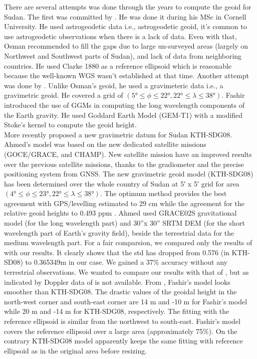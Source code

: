 There are several attempts was done through the years to compute the geoid for Sudan. The first was committed by \cite{osman}. He was done it during his MSc in Cornell University. He used astrogeodetic data i.e., astrogeodetic geoid, it's common to use astrogeodetic observations when there is a lack of data. Even with that, Osman recommended to fill the gaps due to large un-surveyed areas (largely on Northwest and Southwest parts of Sudan), and lack of data from neighboring countries. He used Clarke 1880 as a reference ellipsoid which is reasonable because the well-known WGS wasn't established at that time. Another attempt was done by \cite{fashir}. Unlike Osman's geoid, he used a gravimeteric data i.e., a gravimetric geoid. He covered a grid of $(5 \si{\degree} \le \phi \le 22 \si{\degree} , 22 \si{\degree} \le \lambda \le 38\si{\degree})$. Fashir introduced the use of GGMs in computing the long wavelength components of the Earth gravity. He used Goddard Earth Model (GEM-T1) with a modified Stoke's kernel to compute the geoid height.\\
More recently \citep{ahmed_msc} proposed a new gravimetric datum for Sudan KTH-SDG08. Ahmed's model was based on the new dedicated satellite missions (GOCE/GRACE, and CHAMP). New satellite mission have an improved results over the previous satellite missions, thanks to the gradiometer and the precise positioning system from GNSS. The new gravimetric geoid model (KTH-SDG08) has been determined over the whole country of Sudan at 5′ x 5′ grid for area $(4 \si{\degree} \le \phi \le 23 \si{\degree}, 22 \si{\degree} \le \lambda \le 38 \si{\degree})$. The optimum method provides the best agreement with GPS/levelling estimated to 29 cm while the agreement for the relative geoid heights to 0.493 ppm \cite{ahmed_msc}. Ahmed used GRACE02S gravitational model (for the long wavelength part) and 30”x 30” SRTM DEM (for the short wavelength part of Earth's gravity field), beside the terrestrial data for the medium wavelength part. For a fair comparsion, we compared only the results of \cite{ahmed_msc} with our results. It clearly shows that the std has dropped from 0.576 (in KTH-SD08) to 0.365349m in our case. We gained a 37\% accuracy without any terrestrial observations.
We wanted to compare our results with that of \cite{fashir}, but as indicated by \cite{ahmed_msc} Doppler data of \cite{fashir} is not available. From \cite{ahmed_msc}, Fashir’s model looks smoother than KTH-SDG08. The drastic values of the geoidal height in the north-west corner and south-east corner are 14 m and -10 m for Fashir’s model while 20 m and -14 m for KTH-SDG08, respectively. The fitting with the reference ellipsoid is similar from the northwest to south-east. Fashir’s model covers the reference ellipsoid over a large area
(approximately 75\%). On the contrary KTH-SDG08 model apparently keeps the same fitting
with reference ellipsoid as in the original area before resizing.




